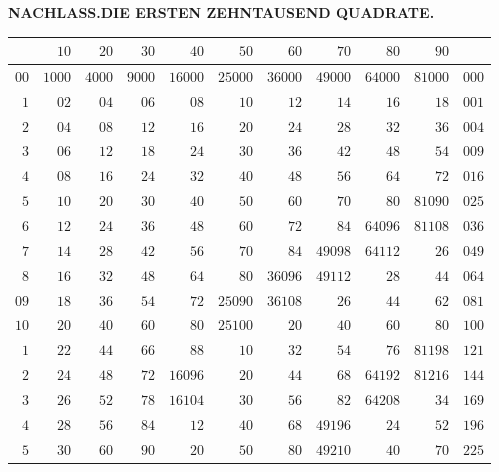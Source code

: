 \clearpage{}%
\renewcommand{\BookRunningTitle}{Die ersten zehntausend Quadrate}
\begin{center}\textbf{NACHLASS.\quad DIE ERSTEN ZEHNTAUSEND QUADRATE.}\end{center}
\begingroup\fontsize{8.5}{10}\selectfont\setlength{\tabcolsep}{2pt}\renewcommand{\arraystretch}{1}
\begin{longtable}{@{}r|r|r|r|r|r|r|r|r|r|r@{}}
\hline
 & $10$ & $20$ & $30$ & $40$ & $50$ & $60$ & $70$ & $80$ & $90$ & \\
\hline\endhead
$00$ & $1000$ & $4000$ & $9000$ & $16000$ & $25000$ & $36000$ & $49000$ & $64000$ & $81000$ & $000$\\
$1$ & $02$ & $04$ & $06$ & $08$ & $10$ & $12$ & $14$ & $16$ & $18$ & $001$\\
$2$ & $04$ & $08$ & $12$ & $16$ & $20$ & $24$ & $28$ & $32$ & $36$ & $004$\\
$3$ & $06$ & $12$ & $18$ & $24$ & $30$ & $36$ & $42$ & $48$ & $54$ & $009$\\
$4$ & $08$ & $16$ & $24$ & $32$ & $40$ & $48$ & $56$ & $64$ & $72$ & $016$\\
$5$ & $10$ & $20$ & $30$ & $40$ & $50$ & $60$ & $70$ & $80$ & $81090$ & $025$\\
$6$ & $12$ & $24$ & $36$ & $48$ & $60$ & $72$ & $84$ & $64096$ & $81108$ & $036$\\
$7$ & $14$ & $28$ & $42$ & $56$ & $70$ & $84$ & $49098$ & $64112$ & $26$ & $049$\\
$8$ & $16$ & $32$ & $48$ & $64$ & $80$ & $36096$ & $49112$ & $28$ & $44$ & $064$\\
$09$ & $18$ & $36$ & $54$ & $72$ & $25090$ & $36108$ & $26$ & $44$ & $62$ & $081$\\
$10$ & $20$ & $40$ & $60$ & $80$ & $25100$ & $20$ & $40$ & $60$ & $80$ & $100$\\
$1$ & $22$ & $44$ & $66$ & $88$ & $10$ & $32$ & $54$ & $76$ & $81198$ & $121$\\
$2$ & $24$ & $48$ & $72$ & $16096$ & $20$ & $44$ & $68$ & $64192$ & $81216$ & $144$\\
$3$ & $26$ & $52$ & $78$ & $16104$ & $30$ & $56$ & $82$ & $64208$ & $34$ & $169$\\
$4$ & $28$ & $56$ & $84$ & $12$ & $40$ & $68$ & $49196$ & $24$ & $52$ & $196$\\
$5$ & $30$ & $60$ & $90$ & $20$ & $50$ & $80$ & $49210$ & $40$ & $70$ & $225$\\

\end{longtable}
